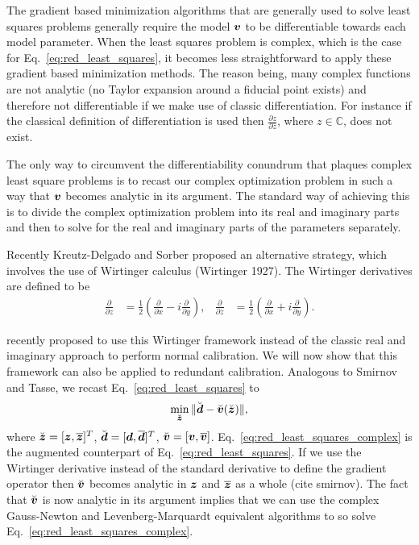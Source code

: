 \documentclass[useAMS,usenatbib]{mn2e}
\newcommand{\bz}{\bmath{z}}
\newcommand{\bd}{\bmath{d}}
\newcommand{\bv}{\bmath{v}}
\newcommand{\conj}[1]{\overline{#1}}
\begin{document}
The gradient based minimization algorithms that are generally used to solve least squares problems generally require the model $\bv$ to be differentiable
towards each model parameter. When the least squares problem is complex, which is the case for Eq.~\eqref{eq:red_least_squares}, it becomes less straightforward to apply these gradient based minimization methods. The reason being,
many complex functions are not analytic (no Taylor expansion around a fiducial point exists) and therefore not differentiable if we make use of classic differentiation. For instance if the 
classical definition of differentiation is used then $\frac{\partial z}{\partial \conj{z}}$, where $z \in \mathbb{C}$, does not exist.

The only way to circumvent the differentiability conundrum that plaques complex least square problems is to recast our complex optimization problem in such a way that $\bv$ becomes analytic in its argument.
The standard way of achieving this is to divide the complex optimization problem into its real and imaginary parts and then to solve for the real and imaginary parts of the parameters separately.

Recently Kreutz-Delgado and Sorber proposed an alternative strategy, which involves the use of Wirtinger calculus (Wirtinger 1927). The Wirtinger derivatives 
are defined to be 
\begin{align}
\frac{\partial}{\partial z} &= \frac{1}{2}\left ( \frac{\partial}{\partial x} -  i \frac{\partial}{\partial y} \right ),&\frac{\partial}{\partial \conj{z}} &= \frac{1}{2}\left ( \frac{\partial}{\partial x} +  i \frac{\partial}{\partial y} \right ). 
\end{align}

\cite{Smirnov2015} recently proposed to use this Wirtinger framework instead of the classic real and imaginary approach to perform normal calibration. We will now show
that this framework can also be applied to redundant calibration. Analogous to Smirnov and Tasse, we recast Eq.~\eqref{eq:red_least_squares} to 
\begin{equation}
\label{eq:red_least_squares_complex}
\min_{\breve{\bz}} \|\breve{\bd} - \breve{\bv}(\breve{\bz})\|, 
\end{equation}
where $\breve{\bz} = [\bz,\conj{\bz}]^T$, $\breve{\bd} = [\bd,\conj{\bd}]^T$, $\breve{\bv} = [\bv,\conj{\bv}]$. Eq.~\eqref{eq:red_least_squares_complex} is the augmented counterpart of Eq.~\eqref{eq:red_least_squares}.
If we use the Wirtinger derivative instead of the standard derivative to define the gradient operator then 
$\breve{\bv}$ becomes analytic in $\bz$ and $\conj{\bz}$ as a whole (cite smirnov). The fact that $\breve{\bv}$ is now analytic in its argument implies that we can use the complex Gauss-Newton
and Levenberg-Marquardt equivalent algorithms to so solve Eq.~\eqref{eq:red_least_squares_complex}.
\end{document}
